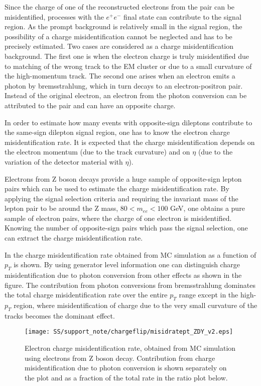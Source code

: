 Since the charge of one of the reconstructed electrons from the pair can be misidentified, 
processes with the $e^{+}e^{-}$ final state can contribute to the signal region.
As the prompt background is relatively small in the signal region, the possibility of a charge misidentification cannot be neglected and has to be precisely estimated. 
Two cases are considered as a charge misidentification background. 
The first one is when the electron charge is truly misidentified due to matching of the wrong track to the EM cluster 
or due to a small curvature of the high-momentum track. 
The second one arises when an electron emits a photon by bremsstrahlung, which in turn decays to an electron-positron pair. 
Instead of the original electron, an electron from the photon conversion can be attributed to the pair and can have an opposite charge.

In order to estimate how many events with opposite-sign dileptons contribute to the same-sign dilepton signal region, 
one has to know the electron charge misidentification rate. It is expected that the charge misidentification depends on the electron momentum (due to the track curvature) 
and on $\eta$ (due to the variation of the detector material with $\eta$).

Electrons from Z boson decays provide a huge sample of opposite-sign lepton pairs which can be used to estimate the charge misidentification rate. 
By applying the signal selection criteria
and requiring the invariant mass of the lepton pair to be around the Z mass, $80 < m_{ee} < 100$ GeV, one obtains a pure
sample of electron pairs, where the charge of one electron is misidentified. Knowing the number of opposite-sign pairs which pass the signal selection, 
one can extract the charge misidentification rate.

In  the charge misidentification rate obtained from MC simulation as a function of $p_T$ is shown.
By using generator level information one can distinguish charge misidentification due to photon conversion from other effects as shown in the figure.
The contribution from photon conversions from bremsstrahlung dominates 
the total charge misidentification rate over the entire $p_T$ range except in the high-$p_T$ region, where misidentification 
of charge due to the very small curvature of the tracks becomes the dominant effect.

\begin{figure}
\begin{center}
 \texttt{[image: SS/support\_note/chargeflip/misidratept\_ZDY\_v2.eps]}
\caption{Electron charge misidentification rate, obtained from MC simulation using electrons from Z boson decay. 
Contribution from charge misidentification due to photon conversion is shown separately on the plot and as a fraction of the total rate in the ratio plot below.}
\label{fig:chargeFlip_structure}
\end{center}
\end{figure}

